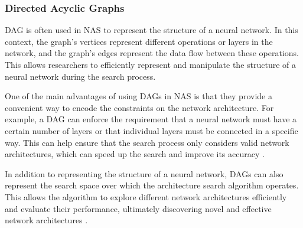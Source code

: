 
\clearpage

\subsubsection{Directed Acyclic Graphs}
\Gls{DAG} is often used in \gls{NAS} to represent the structure of a neural network. In this context, the graph's vertices represent different operations or layers in the network, and the graph's edges represent the data flow between these operations. This allows researchers to efficiently represent and manipulate the structure of a neural network during the search process.

One of the main advantages of using \glspl{DAG} in \gls{NAS} is that they provide a convenient way to encode the constraints on the network architecture. For example, a \gls{DAG} can enforce the requirement that a neural network must have a certain number of layers or that individual layers must be connected in a specific way. This can help ensure that the search process only considers valid network architectures, which can speed up the search and improve its accuracy \autocite{https://doi.org/10.48550/arxiv.1806.09055}. 

In addition to representing the structure of a neural network, \glspl{DAG} can also represent the search space over which the architecture search algorithm operates. This allows the algorithm to explore different network architectures efficiently and evaluate their performance, ultimately discovering novel and effective network architectures \autocite{inproceedings}. 
